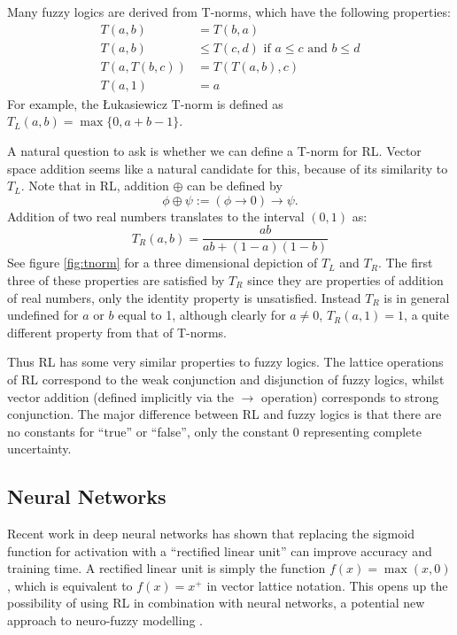 \documentclass[journal,draftcls,onecolumn]{IEEEtran}
\theoremstyle{definition}
\begin{document}
Many fuzzy logics are derived from T-norms, which have the following
properties:
\begin{align}
\tag{Commutativity} T(a, b) &= T(b, a) \\
\tag{Monotonicity} T(a, b) &\le T(c, d) \text{ if } a \le c  \text{ and } b \le d\\
\tag{Associativity} T(a, T(b, c)) &= T(T(a, b), c)\\
\tag{Identity} T(a, 1) &= a
\end{align}
For example, the \L ukasiewicz T-norm is defined as $T_L(a,b) =
\max\{0,a + b - 1\}$.

A natural question to ask is whether we can define a T-norm for
RL. Vector space addition seems like a natural candidate for this,
because of its similarity to $T_L$. Note that in RL, addition $\oplus$
can be defined by
$$\phi \oplus \psi := (\phi \rightarrow 0) \rightarrow \psi.$$
Addition of two real numbers translates to the interval $(0,1)$ as:
$$T_R(a, b) = \frac{ab}{ab + (1-a)(1-b)}$$
See figure \ref{fig:tnorm} for a three dimensional depiction of $T_L$
and $T_R$. The first three of these properties are satisfied by $T_R$
since they are properties of addition of real numbers, only the
identity property is unsatisfied. Instead $T_R$ is in general
undefined for $a$ or $b$ equal to 1, although clearly for $a \neq 0$,
$T_R(a,1) = 1$, a quite different property from that of T-norms.

Thus RL has some very similar properties to fuzzy logics. The lattice
operations of RL correspond to the weak conjunction and disjunction of
fuzzy logics, whilst vector addition (defined implicitly via the
$\rightarrow$ operation) corresponds to strong conjunction. The major
difference between RL and fuzzy logics is that there are no constants
for ``true'' or ``false'', only the constant 0 representing complete
uncertainty.

\subsection{Neural Networks}

Recent work in deep neural networks \cite{Dahl:13} has shown that
replacing the sigmoid function for activation with a ``rectified
linear unit'' can improve accuracy and training time. A rectified
linear unit is simply the function $f(x) = \max(x, 0)$, which is
equivalent to $f(x) = x^+$ in vector lattice notation. This opens up
the possibility of using RL in combination with neural networks, a
potential new approach to neuro-fuzzy modelling \cite{Lin:91,Jang:95,Abe:12}.
\end{document}
